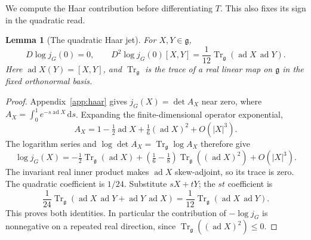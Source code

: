 \documentclass[11pt,reqno]{amsart}
\numberwithin{equation}{section}
\newtheorem{lemma}[theorem]{Lemma}
\theoremstyle{definition}
\theoremstyle{remark}
\newcommand{\dd}{\mathrm d}
\newcommand{\g}{\mathfrak g}
\DeclareMathOperator{\ad}{ad}
\begin{document}
We compute the Haar contribution before differentiating
\(T\). This also fixes its sign in the quadratic read.

\begin{lemma}[The quadratic Haar jet]
\label{lem:matching-haar-jet}
For \(X,Y\in\g\),
\begin{equation}
 D\log j_G(0)=0,\qquad
 D^2\log j_G(0)[X,Y]
                  =\frac1{12}\operatorname{Tr}_{\g}
                                     (\ad X\,\ad Y).
 \label{eq:matching-haar-jet}
\end{equation}
Here \(\ad X(Y)=[X,Y]\), and
\(\operatorname{Tr}_{\g}\) is the trace of a real linear
map on \(\g\) in the fixed orthonormal basis.
\end{lemma}
\begin{proof}
Appendix~\ref{app:haar} gives
\(j_G(X)=\det A_X\) near zero, where
\(A_X=\int_0^1e^{-s\ad X}\,\dd s\).
Expanding the finite-dimensional operator exponential,
\[
 A_X=1-\tfrac12\ad X+\tfrac16(\ad X)^2+O(|X|^3).
\]
The logarithm series and
\(\log\det A_X=\operatorname{Tr}_{\g}\log A_X\)
therefore give
\[
 \log j_G(X)
   =-\tfrac12\operatorname{Tr}_{\g}(\ad X)
       +\left(\tfrac16-\tfrac18\right)
                       \operatorname{Tr}_{\g}((\ad X)^2)
       +O(|X|^3).
\]
The invariant real inner product makes \(\ad X\)
skew-adjoint, so its trace is zero. The quadratic
coefficient is \(1/24\). Substitute \(sX+tY\);
the \(st\) coefficient is
\[
 \frac1{24}\operatorname{Tr}_{\g}
               (\ad X\,\ad Y+\ad Y\,\ad X)
       =\frac1{12}\operatorname{Tr}_{\g}(\ad X\,\ad Y).
\]
This proves both identities.
In particular the contribution of \(-\log j_G\) is
nonnegative on a repeated real direction, since
\(\operatorname{Tr}_{\g}((\ad X)^2)\le0\).
\end{proof}
\end{document}
